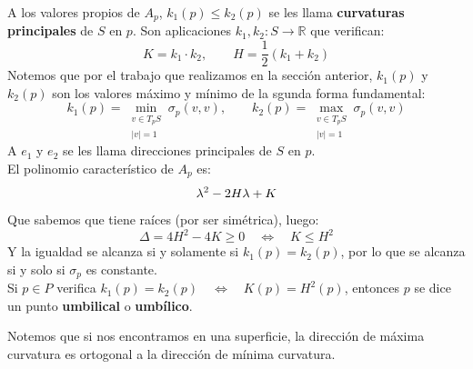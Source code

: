 \begin{notacion}
    A los valores propios de $A_p$, $k_1(p)\leq k_2(p)$ se les llama \textbf{curvaturas principales} de $S$ en $p$. Son aplicaciones $k_1,k_2:S\to\mathbb{R}$ que verifican:
    \begin{equation*}
        K = k_1\cdot k_2, \qquad H = \frac{1}{2}(k_1+k_2)
    \end{equation*}
    Notemos que por el trabajo que realizamos en la sección anterior, $k_1(p)$ y $k_2(p)$ son los valores máximo y mínimo de la sgunda forma fundamental:
    \begin{equation*}
        k_1(p) = \min_{\substack{v\in T_pS\\|v| =1}} \sigma_p(v,v), \qquad k_2(p) = \max_{\substack{v\in T_pS\\|v| =1}}\sigma_p(v,v)
    \end{equation*}
    A $e_1$ y $e_2$ se les llama direcciones principales de $S$ en $p$.\\

    \noindent
    El polinomio característico de $A_p$ es:
    \begin{equation*}
        \lambda^2 - 2H\lambda + K 
    \end{equation*}
    Que sabemos que tiene raíces (por ser simétrica), luego:
    \begin{equation*}
        \Delta = 4H^2 - 4K \geq 0 \quad\Longleftrightarrow\quad K\leq H^2
    \end{equation*}
    Y la igualdad se alcanza si y solamente si $k_1(p) = k_2(p)$, por lo que se alcanza si y solo si $\sigma_p$ es constante.\\

    \noindent
    Si $p\in P$ verifica $k_1(p) = k_2(p) \quad\Longleftrightarrow\quad K(p) = H^2(p)$, entonces $p$ se dice un punto \textbf{umbilical} o \textbf{umbílico}.
\end{notacion}

\begin{observacion}
    Notemos que si nos encontramos en una superficie, la dirección de máxima curvatura es ortogonal a la dirección de mínima curvatura.
\end{observacion}

